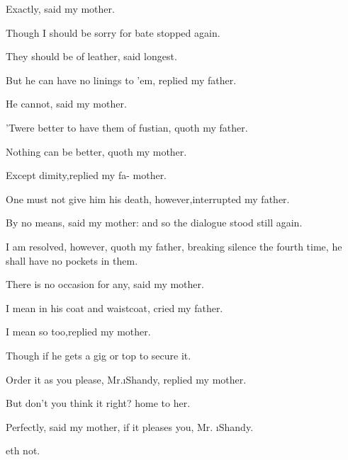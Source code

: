 \documentclass[twoside]{article}
\begin{document}
Exactly, said my mother.\tush

\tshh Though I should be sorry for\break
{}
bate stopped again.

\tshh They should be of leather, said\break
{}
\parskip 10pt
longest.

But he can have no linings to ’em,\break
replied my father.\tush

He cannot, said my mother.

’Twere better to have them of fustian,\break
quoth my father.

Nothing can be better, quoth my\break
mother.\tush

\tshh Except dimity,\tsk replied my fa-\break
{}
mother.

\tshh One must not give him his death,\break
however,\tsk interrupted my father.

By no means, said my mother:\tshh\break
and so the dialogue stood still again.

\parskip 12pt

\topstrut I am resolved, however, quoth my\break
father, breaking silence the fourth time,\break
he shall have no pockets in them.\tsh

\tshh There is no occasion for any,\break
said my mother.\tush

I mean in his coat and waistcoat,\tsk\break
cried my father.

\tshh I mean so too,\tsk replied my\break
mother.

\tshh Though if he gets a gig or top\break
{}
to secure it.\tush

Order it as you please, Mr.\@ \i{Shandy}, replied my
mother.\tush


\tshh But don’t you think it right?\break
{}
home to her.

Perfectly, said my mother, if it pleases\break
you, Mr. \i{Shandy.}\tush

\tshh {}\break
{}
eth not.
\end{document}
